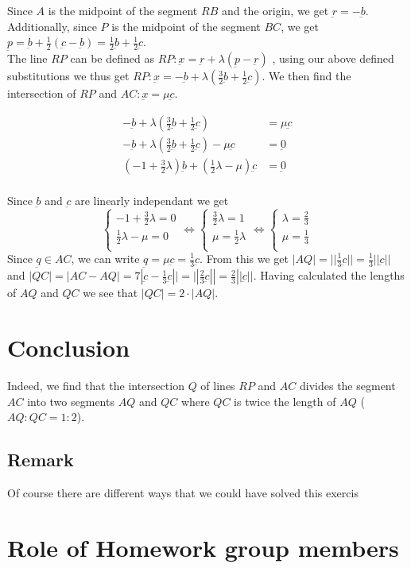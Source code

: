 \documentclass{article}
\renewcommand{\v}[1]{\underbar{#1}}
\theoremstyle{mytheoremstyle}
\theoremstyle{mytheoremstyle}
\theoremstyle{myproblemstyle}
\begin{document}
    Since $A$ is the midpoint of the segment $RB$ and the origin, we get $\v{r} = - \v{b}$. Additionally, since $P$ is the 
    midpoint of the segment $BC$, we get $\v{p} = \v{b} + \frac{1}{2}(\v{c} - \v{b}) = \frac{1}{2} \v{b} + \frac{1}{2} \v{c}$. \\
    The line $RP$ can be defined as $RP: \v{x} = \v{r} + \lambda (\v{p} - \v{r})$ \cite{vecLineRep}, using our above defined substitutions we thus get
    $RP: \v{x} = - \v{b} + \lambda (\frac{3}{2} \v{b} + \frac{1}{2} \v{c})$. We then find the intersection of $RP$ and $AC: \v{x} = \mu \v{c}$.
    
    \begin{align*}
        - \v{b} + \lambda (\frac{3}{2} \v{b} + \frac{1}{2} \v{c}) &= \mu \v{c} \\
        - \v{b} + \lambda (\frac{3}{2} \v{b} + \frac{1}{2} \v{c}) - \mu \v{c} &= \v{0} \\
        (-1 + \frac{3}{2} \lambda) \v{b} + (\frac{1}{2}\lambda - \mu)\v{c} &= \v{0} \\
    \end{align*}
    
Since $\v{b}$ and $\v{c}$ are linearly independant \cite{linIndepVecs} we get 
$$
\begin{cases}
    -1 + \frac{3}{2} \lambda = 0 \\
    \frac{1}{2}\lambda - \mu = 0 \\
\end{cases}
\iff
\begin{cases}
    \frac{3}{2} \lambda = 1 \\
    \mu = \frac{1}{2} \lambda \\
\end{cases}
\iff
\begin{cases}
    \lambda = \frac{2}{3} \\
    \mu = \frac{1}{3} \\
\end{cases}
$$
Since $\v{q} \in AC$, we can write $\v{q} = \mu \v{c} = \frac{1}{3} \v{c}$. From this we get $|AQ| = ||\frac{1}{3} \v{c}|| = \frac{1}{3}||\v{c}||$
and $|QC| = |AC - AQ| = 7|\v{c} - \frac{1}{3} \v{c}|| = ||\frac{2}{3} \v{c}|| = \frac{2}{3}||\v{c}||$.
Having calculated the lengths of $AQ$ and $QC$ we see that $|QC| = 2 \cdot |AQ|$.

 
    \section{Conclusion}
    Indeed, we find that the intersection $Q$ of lines $RP$ and $AC$ divides the segment $AC$ 
    into two segments $AQ$ and $QC$ where $QC$ is twice the length of $AQ$ ($AQ:QC = 1:2$).

    \subsection*{Remark}
    Of course there are different ways that we could have solved this exercis

    \section{Role of Homework group members}
    
        
    
\end{document}
